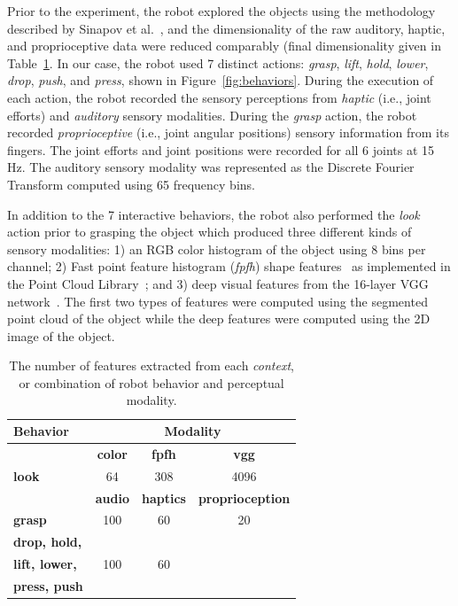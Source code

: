 \documentclass{article}
\providecommand{\DIFadd}[1]{{\protect\color{blue}\uwave{#1}}} %
\providecommand{\DIFaddbegin}{} %
\providecommand{\DIFaddend}{} %
\begin{document}
Prior to the experiment, the robot explored the objects using the methodology described by Sinapov et al.~, and the dimensionality of the raw auditory, haptic, and proprioceptive data were reduced comparably (final dimensionality given in Table~\ref{tab:feature_space_of_contexts}\DIFaddbegin \DIFadd{)}\DIFaddend .
In our case, the robot used 7 distinct actions: {\it grasp}, {\it lift}, {\it hold}, {\it lower}, {\it drop}, {\it push}, and {\it press}, shown in Figure~\ref{fig:behaviors}.
During the execution of each action, the robot recorded the sensory perceptions from {\it haptic} (i.e., joint efforts) and {\it auditory} sensory modalities.
During the {\it grasp} action, the robot recorded {\it proprioceptive} (i.e., joint angular positions) sensory information from its fingers.
The joint efforts and joint positions were recorded for all 6 joints at 15 Hz.
The auditory sensory modality was represented as the Discrete Fourier Transform computed using 65 frequency bins.

In addition to the 7 interactive behaviors, the robot also performed the {\it look} action prior to grasping the object which produced three different kinds of sensory modalities: 1) an RGB color histogram of the object using 8 bins per channel; 2) Fast point feature histogram ({\it fpfh}) shape features~\cite{rusu:icra09} as implemented in the Point Cloud Library~\cite{aldoma:ram12}; and 3) deep visual features from the 16-layer VGG network~\cite{simonyan:corr14}.
The first two types of features were computed using the segmented point cloud of the object while the deep features were computed using the 2D image of the object. 

\begin{table}
\centering
\begin{tabular}[h]{|l|c|c|c|}
	\hline
	\bf Behavior & \multicolumn{3}{c|}{\bf Modality} \\ \hline \hline
	& \bf color & \bf fpfh & \bf vgg \\ \hline
	\bf look & 64 & 308 & 4096 \\ \hline \hline
	& \bf audio & \bf haptics & \bf proprioception \\ \hline
	\bf grasp & 100 & 60 & 20 \\ \hline
	\bf drop, hold, & & & \\
	\bf lift, lower, & 100 & 60 & \\
	\bf press, push & & & \\ \hline
\end{tabular}
\caption{The number of features extracted from each \textit{context}, or combination of robot behavior and perceptual modality.}
\label{tab:feature_space_of_contexts}
\end{table}
\end{document}
